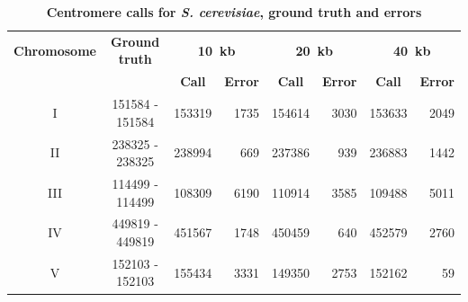 \begin{table}[ht!]
\caption{\textbf{Centromere calls for \textit{S. cerevisiae}, ground truth and
errors}}
\vspace{10pt}
\begin{center}
\begin{tabular}{c | c  r  r  r  r r r}
\textbf{Chromosome}  & \textbf{Ground truth} & \multicolumn{2}{c}{\textbf{10~kb}} & \multicolumn{2}{c}{\textbf{20~kb}} & \multicolumn{2}{c}{\textbf{40~kb}} \\
  &   &  \multicolumn{1}{c}{\textbf{Call}} &  \multicolumn{1}{c}{\textbf{Error}} &  \multicolumn{1}{c}{\textbf{Call}} &  \multicolumn{1}{c}{\textbf{Error}} &  \multicolumn{1}{c}{\textbf{Call}} &  \multicolumn{1}{c}{\textbf{Error}} \\
\hline
I & \num[group-separator={\,}]{151584} - \num[group-separator={\,}]{151584} & \num[group-separator={\,}]{153319} & \small{\num[group-separator={\,}]{1735}}  & \num[group-separator={\,}]{154614} & \small{\num[group-separator={\,}]{3030}}  & \num[group-separator={\,}]{153633} & \small{\num[group-separator={\,}]{2049}}  \\
II & \num[group-separator={\,}]{238325} - \num[group-separator={\,}]{238325} & \num[group-separator={\,}]{238994} & \small{\num[group-separator={\,}]{669}}  & \num[group-separator={\,}]{237386} & \small{\num[group-separator={\,}]{939}}  & \num[group-separator={\,}]{236883} & \small{\num[group-separator={\,}]{1442}}  \\
III & \num[group-separator={\,}]{114499} - \num[group-separator={\,}]{114499} & \num[group-separator={\,}]{108309} & \small{\num[group-separator={\,}]{6190}}  & \num[group-separator={\,}]{110914} & \small{\num[group-separator={\,}]{3585}}  & \num[group-separator={\,}]{109488} & \small{\num[group-separator={\,}]{5011}}  \\
IV & \num[group-separator={\,}]{449819} - \num[group-separator={\,}]{449819} & \num[group-separator={\,}]{451567} & \small{\num[group-separator={\,}]{1748}}  & \num[group-separator={\,}]{450459} & \small{\num[group-separator={\,}]{640}}  & \num[group-separator={\,}]{452579} & \small{\num[group-separator={\,}]{2760}}  \\
V & \num[group-separator={\,}]{152103} - \num[group-separator={\,}]{152103} & \num[group-separator={\,}]{155434} & \small{\num[group-separator={\,}]{3331}}  & \num[group-separator={\,}]{149350} & \small{\num[group-separator={\,}]{2753}}  & \num[group-separator={\,}]{152162} & \small{\num[group-separator={\,}]{59}}  \\

\end{tabular}
\end{center}
\end{table}
